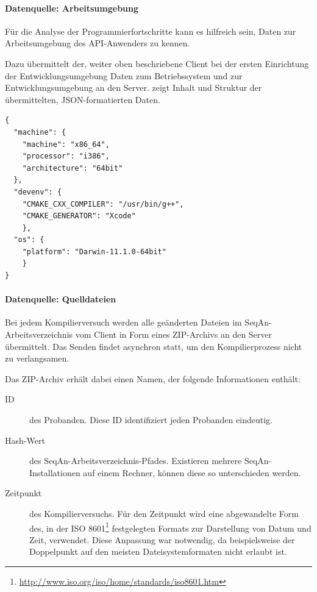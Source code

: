 \paragraph{Datenquelle: Arbeitsumgebung}

Für die Analyse der Programmierfortschritte kann es hilfreich sein, Daten zur Arbeitsumgebung des API-Anwenders zu kennen.
  
Dazu übermittelt der, weiter oben beschriebene Client bei der ersten Einrichtung der Entwicklungsumgebung Daten zum Betriebssystem und zur Entwicklungsumgebung an den Server.  zeigt Inhalt und Struktur der übermittelten, JSON-formatierten Daten.

\begin{center}
\begin{verbatim}
{
  "machine": {
    "machine": "x86_64",
    "processor": "i386",
    "architecture": "64bit"
  },
  "devenv": {
    "CMAKE_CXX_COMPILER": "/usr/bin/g++",
    "CMAKE_GENERATOR": "Xcode"
    },
  "os": {
    "platform": "Darwin-11.1.0-64bit"
    }
}
\end{verbatim}
\label{lst:apiua-data-demografisch}
\end{center}


\paragraph{Datenquelle: Quelldateien}

Bei jedem Kompilierversuch werden alle geänderten Dateien im SeqAn-Arbeitsverzeichnis vom Client in Form eines ZIP-Archivs an den Server übermittelt. Das Senden findet asynchron statt, um den Kompilierprozess nicht zu verlangsamen.

Das ZIP-Archiv erhält dabei einen Namen, der folgende Informationen enthält:
\begin{description}
  \item[ID] des Probanden. Diese ID identifiziert jeden Probanden eindeutig.
  \item[Hash-Wert] des SeqAn-Arbeitsverzeichnis-Pfades. Existieren mehrere SeqAn-Installationen auf einem Rechner, können diese so unterschieden werden.
  \item[Zeitpunkt] des Kompilierversuchs. Für den Zeitpunkt wird eine abgewandelte Form des, in der ISO 8601\footnote{\url{http://www.iso.org/iso/home/standards/iso8601.htm}} festgelegten Formats zur Darstellung von Datum und Zeit, verwendet. Diese Anpassung war notwendig, da beispielsweise der Doppelpunkt auf den meisten Dateisystemformaten nicht erlaubt ist.
\end{description}

